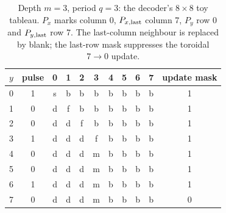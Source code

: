 \begin{table}[ht]
\centering\small
\begin{tabular}{@{}cc|cccccccc|c@{}}
\toprule $y$&pulse&0&1&2&3&4&5&6&7&update mask\\\midrule
0&1&s&b&b&b&b&b&b&b&1\\
1&0&d&f&b&b&b&b&b&b&1\\
2&0&d&d&f&b&b&b&b&b&1\\
3&1&d&d&d&f&b&b&b&b&1\\
4&0&d&d&d&m&b&b&b&b&1\\
5&0&d&d&d&m&b&b&b&b&1\\
6&1&d&d&d&m&b&b&b&b&1\\
7&0&d&d&d&m&b&b&b&b&0\\
\bottomrule
\end{tabular}
\caption{Depth $m=3$, period $q=3$: the decoder's $8\times8$ toy tableau.
$P_x$ marks column 0, $P_{x,\rm last}$ column 7, $P_y$ row 0 and
$P_{y,\rm last}$ row 7. The last-column neighbour is replaced by blank;
the last-row mask suppresses the toroidal $7\to0$ update.}\label{tab:toy}
\end{table}
